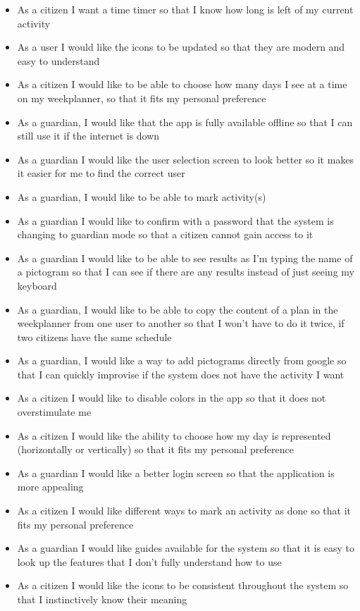 \begin{itemize}
    \item As a citizen I want a time timer so that I know how long is left of my current activity
    \item As a user I would like the icons to be updated so that they are modern and easy to understand
    \item As a citizen I would like to be able to choose how many days I see at a time on my weekplanner, so that it fits my personal preference
    \item As a guardian, I would like that the app is fully available offline so that I can still use it if the internet is down
    \item As a guardian I would like the user selection screen to look better so it makes it easier for me to find the correct user
    \item As a guardian, I would like to be able to mark activity(s)
    \item As a guardian I would like to confirm with a password that the system is changing to guardian mode so that a citizen cannot gain access to it
    \item As a guardian I would like to be able to see results as I'm typing the name of a pictogram so that I can see if there are any results instead of just seeing my keyboard
    \item As a guardian, I would like to be able to copy the content of a plan in the weekplanner from one user to another so that I won't have to do it twice, if two citizens have the same schedule
    \item As a guardian, I would like a way to add pictograms directly from google so that I can quickly improvise if the system does not have the activity I want
    \item As a citizen I would like to disable colors in the app so that it does not overstimulate me
    \item As a citizen I would like the ability to choose how my day is represented (horizontally or vertically) so that it fits my personal preference
    \item As a guardian I would like a better login screen so that the application is more appealing
    \item As a citizen I would like different ways to mark an activity as done so that it fits my personal preference
    \item As a guardian I would like guides available for the system so that it is easy to look up the features that I don't fully understand how to use
    \item As a citizen I would like the icons to be consistent throughout the system so that I instinctively know their meaning
\end{itemize}

